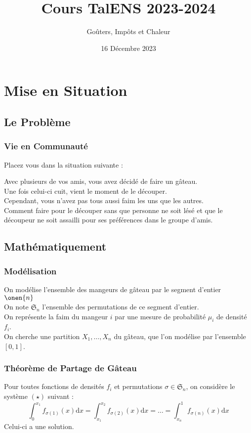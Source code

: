 \documentclass{beamercours}
\title{Cours TalENS 2023-2024}
\subtitle{Goûters, Impôts et Chaleur}
\date{16 Décembre 2023}
\begin{document}
\maketitle

\section{Mise en Situation}
\subsection{Le Problème}
\begin{frame}
    \frametitle{Vie en Communauté}
    Placez vous dans la situation suivante : \\
    \begin{center}
         Avec plusieurs de vos amis, vous avez décidé de faire un gâteau. \\
         Une fois celui-ci cuit, vient le moment de le découper.\\
         Cependant, vous n'avez pas tous aussi faim les uns que les autres. \\
         Comment faire pour le découper sans que personne ne soit lésé et que le découpeur ne soit assailli pour ses préférences dans le groupe d'amis.
    \end{center}
\end{frame}

\subsection{Mathématiquement}
\begin{frame}
    \frametitle{Modélisation}
     On modélise l'ensemble des mangeurs de gâteau par le segment d'entier $\onen{n}$\\
     On note $\mathfrak{S}_{n}$ l'ensemble des permutations de ce segment d'entier. \\
     On représente la faim du mangeur $i$ par une mesure de probabilité $\mu_{i}$ de densité $f_{i}$. \\
     On cherche une partition $X_{1}, \ldots, X_{n}$ du gâteau, que l'on modélise par l'ensemble $\left[0, 1\right]$.
\end{frame}

\begin{frame}
    \frametitle{Théorème de Partage de Gâteau}
    \begin{theorem}
        Pour toutes fonctions de densités $f_{i}$ et permutations $\sigma \in \mathfrak{S}_{n}$, on considère le système $(\star)$ suivant : 
        \begin{equation*}\tag{$\star$}
            \int_{0}^{x_{1}}f_{\sigma(1)}(x) \mathrm{d}x = \int_{x_{1}}^{x_{2}}f_{\sigma(2)}(x)\mathrm{d}x = \ldots = \int_{x_{n}}^{1}f_{\sigma(n)}(x) \mathrm{d}x 
        \end{equation*}  
        Celui-ci a une solution. 
    \end{theorem}
\end{frame}
\end{document}
